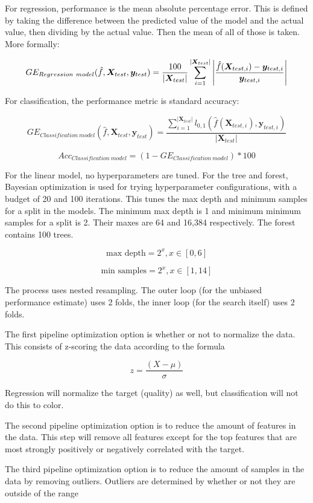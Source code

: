 \documentclass[12pt, letterpaper]{article}
\begin{document}
For regression, performance is the mean absolute percentage error. This is defined by taking the difference between the predicted value of the model and the actual value, then dividing by the actual value. Then the mean of all of those is taken. More formally:

$$
    GE_{Regression\ model}(\hat{f}, \bm{X}_{test}, \bm{y}_{test}) = \frac{100}{|\bm{X}_{test}|} \sum_{i=1}^{|\bm{X}_{test}|} \abs{\frac{\hat{f}(\bm{X}_{test,i}) - \bm{y}_{test,i}}{\bm{y}_{test,i}}}
$$

For classification, the performance metric is standard accuracy:

$$
    GE_{Classification\ model}(\hat{f}, \bm{X}_{test}, \bm{y}_{test}) = \frac{\sum_{i=1}^{|\bm{X}_{test}|}l_{0,1}(\hat{f}(\bm{X}_{test,i}), \bm{y}_{test,i})}{|\bm{X}_{test}|}
$$

$$
Acc_{Classification\ model} = (1 - GE_{Classification\ model}) * 100
$$

For the linear model, no hyperparameters are tuned. For the tree and forest, Bayesian optimization is used for trying hyperparameter configurations, with a budget of 20 and 100 iterations. This tunes the max depth and minimum samples for a split in the models. The minimum max depth is 1 and minimum minimum samples for a split is 2. Their maxes are 64 and 16,384 respectively. The forest contains 100 trees.

$$
\text{max depth} = 2^x, x \in [0,6]
$$

$$
\text{min samples} = 2^x, x \in [1,14]
$$

The process uses nested resampling. The outer loop (for the unbiased performance estimate) uses 2 folds, the inner loop (for the search itself) uses 2 folds.

The first pipeline optimization option is whether or not to normalize the data. This consists of z-scoring the data according to the formula

$$
z = \frac{(X - \mu)}{\sigma}
$$

Regression will normalize the target (quality) as well, but classification will not do this to color.

The second pipeline optimization option is to reduce the amount of features in the data. This step will remove all features except for the top features that are most strongly positively or negatively correlated with the target.

The third pipeline optimization option is to reduce the amount of samples in the data by removing outliers. Outliers are determined by whether or not they are outside of the range
\end{document}
